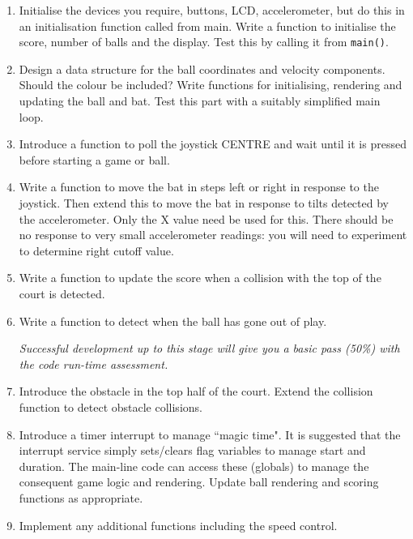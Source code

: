 \documentclass[a4paper]{article}
\begin{document}
{\begin{enumerate}
\item Initialise the devices you require, buttons, LCD, accelerometer,
  but do this in an initialisation function called from main. Write a
  function to initialise the score, number of balls and the
  display. Test this by calling it from {\tt main()}.

\item Design a data structure for the ball coordinates and velocity
  components.  Should the colour be included? Write functions for
  initialising, rendering and updating the ball and bat. Test this
  part with a suitably simplified main loop.

\item Introduce a function to poll the joystick CENTRE and wait until
  it is pressed before starting a game or ball.

\item Write a function to move the bat in steps left or right in
  response to the joystick.  Then extend this to move the bat in
  response to tilts detected by the accelerometer.  Only the X value
  need be used for this. There should be no response to very small
  accelerometer readings: you will need to experiment to determine
  right cutoff value.

\item Write a function to update the score when a collision with the
  top of the court is detected.

\item Write a function to detect when the ball has gone out of play.

  \emph{Successful development up to this stage will give you a basic
    pass (50\%) with the code run-time assessment.}

\item Introduce the obstacle in the top half of the court.  Extend the
  collision function to detect obstacle collisions.

\item Introduce a timer interrupt to manage ``magic time".  It is
  suggested that the interrupt service simply sets/clears flag
  variables to manage start and duration. The main-line code can
  access these (globals) to manage the consequent game logic and
  rendering.  Update ball rendering and scoring functions as
  appropriate.

\item Implement any additional functions including the speed control.
\end{enumerate}

}
\end{document}
